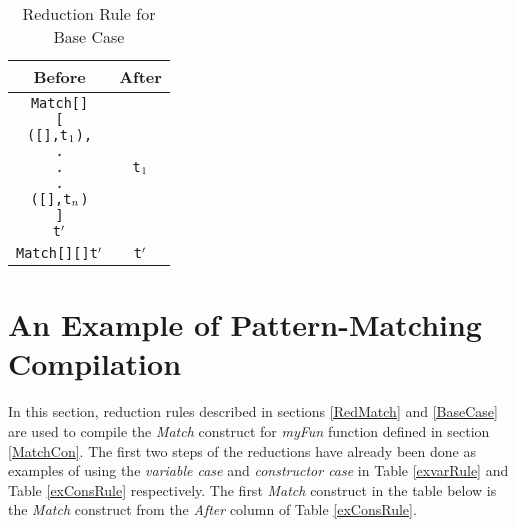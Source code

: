 \documentclass[11pt]{article}
\begin{document}
\begin{table}[h!]
\begin{center}
\begin{tabular}{|c|c|} \hline
{\bf Before} & {\bf After} \\ 
\hline
\begin{minipage}{3in}
 \begin{alltt}

    Match [] 
         [
          ([],t\(\sb{1}\)),
             .
             .
             .
          ([],t\(\sb{n}\))
         ] 
         t\(\sp{\prime}\) 

\end{alltt} 
\end {minipage} &
\begin{minipage}{3.2in}
\begin{alltt}
  t\(\sb{1}\)
     
\end{alltt} 
\end {minipage}\\ 
\hline
\begin{minipage}{3in}
 \begin{alltt}

    Match [] [] t\(\sp{\prime}\) 

\end{alltt} 
\end {minipage} &
\begin{minipage}{3.2in}
\begin{alltt}
  t\(\sp{\prime}\) 
     
\end{alltt} 
\end {minipage}
\tabularnewline
\hline
\end{tabular}
\caption{Reduction Rule for Base Case}
\label{ExBaseCase}
\end{center}
\end{table}

\section {An Example of Pattern-Matching Compilation}
In this section, reduction rules described in sections \ref{RedMatch} and \ref{BaseCase} are used to  compile the {\em Match} construct for {\em myFun} function defined in section \ref{MatchCon}. The first two steps of the reductions have already been done as examples of using the {\em variable case} and {\em constructor case} in Table \ref {exvarRule} and Table \ref {exConsRule} respectively. The first {\em Match} construct in the table below is the {\em Match} construct from the {\em After} column of Table \ref {exConsRule}.
\end{document}
